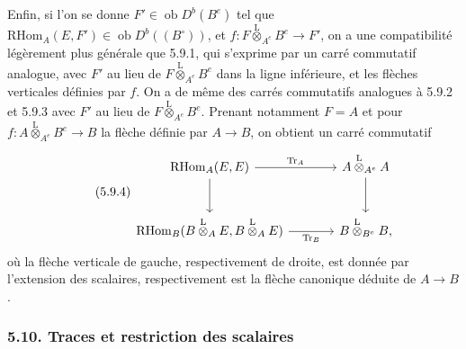 \documentclass[11pt]{article}
\newcommand{\ob}{\operatorname{ob}}
\providecommand{\RHom}{\mathrm{RHom}}
\providecommand{\Tr}{\operatorname{Tr}}
\providecommand{\Tr}{\operatorname{Tr}}
\providecommand{\lten}{\overset{\mathrm L}{\otimes}}
\providecommand{\Tr}{\operatorname{Tr}}
\providecommand{\RHom}{\mathrm{RHom}}
\providecommand{\ob}{\operatorname{ob}}
\providecommand{\lten}{\overset{\mathrm L}{\otimes}}
\providecommand{\RHom}{\mathrm R\mathcal{H}om}
\providecommand{\lten}{\overset{\mathrm L}{\otimes}}
\providecommand{\Tr}{\operatorname{Tr}}
\providecommand{\lten}{\overset{\mathrm L}{\otimes}}
\providecommand{\lten}{\overset{\mathrm L}{\otimes}}
\providecommand{\lten}{\overset{\mathrm L}{\otimes}}
\begin{document}
Enfin, si l'on se donne $F'\in\ob D^b(B^e)$ tel que $\RHom_A(E,F')\in\ob D^b((B^\circ))$, et $f:F\lten_{A^e}B^e\to F'$, on a une compatibilité légèrement plus générale que 5.9.1, qui s'exprime par un carré commutatif analogue, avec $F'$ au lieu de $F\lten_{A^e}B^e$ dans la ligne inférieure, et les flèches verticales définies par $f$. On a de même des carrés commutatifs analogues à 5.9.2 et 5.9.3 avec $F'$ au lieu de $F\lten_{A^e}B^e$. Prenant notamment $F=A$ et pour $f:A\lten_{A^e}B^e\to B$ la flèche définie par $A\to B$, on obtient un carré commutatif
\begin{equation}\tag{5.9.4}
\begin{tikzcd}[column sep=large,row sep=large]
\RHom_A(E,E) \arrow[r,"\Tr_A"] \arrow[d] & A\lten_{A^e}A \arrow[d]\\
\RHom_B(B\lten_AE,B\lten_AE) \arrow[r,"\Tr_B"'] & B\lten_{B^e}B,
\end{tikzcd}
\end{equation}
où la flèche verticale de gauche, respectivement de droite, est donnée par l'extension des scalaires, respectivement est la flèche canonique déduite de $A\to B$.

\subsubsection*{5.10. Traces et restriction des scalaires}
\end{document}
